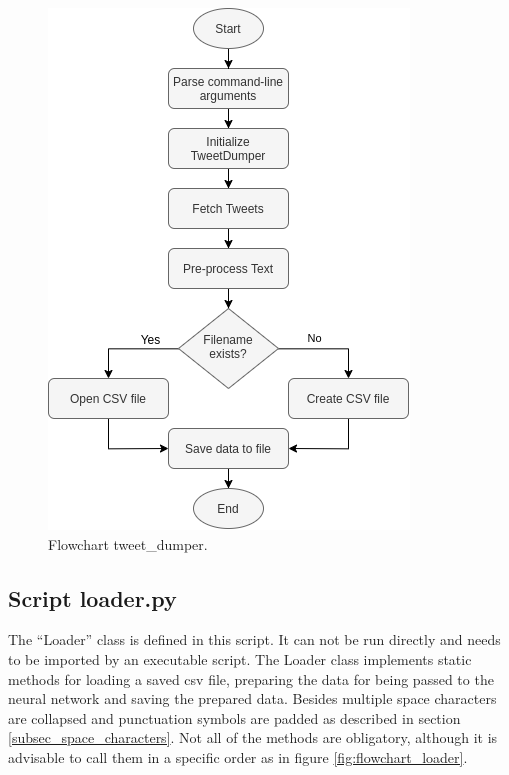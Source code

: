 \documentclass[hidelinks, conference]{IEEEtran}
\begin{document}
\begin{figure}[htbp]
\centerline{\includegraphics[scale=0.61]{pictures/flowchart_tweet_dumper.png}}
\caption{Flowchart tweet\_dumper.}
\label{fig:flowchart_tweet_dumper}
\end{figure}

\subsection{Script loader.py}\label{subsec_loader}

The ``Loader'' class is defined in this script. It can not be run directly and needs to be imported by an executable script. The Loader class implements static methods for loading a saved csv file, preparing the data for being passed to the neural network and saving the prepared data. Besides multiple space characters are collapsed and punctuation symbols are padded as described in section \ref{subsec_space_characters}. Not all of the methods are obligatory, although it is advisable to call them in a specific order as in figure \ref{fig:flowchart_loader}. 
\end{document}
